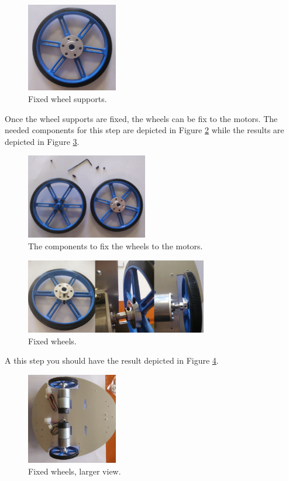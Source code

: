 \documentclass[10pt,a4paper]{report}   %
\begin{document}
\begin{figure}[H]
\center
\includegraphics[width=150px]{images/12.jpg}
\caption{Fixed wheel supports.}
\label{fig:12}
\end{figure}

Once the wheel supports are fixed, the wheels can be fix to the motors. The needed components for this step are depicted in Figure \ref{fig:13} while the results are depicted in Figure \ref{fig:14}.

\begin{figure}[H]
\center
\includegraphics[width=200px]{images/13.jpg}
\caption{The components to fix the wheels to the motors.}
\label{fig:13}
\end{figure}


\begin{figure}[H]
\center
\includegraphics[width=300px]{images/14.jpg}
\caption{Fixed wheels.}
\label{fig:14}
\end{figure}

A this step you should have the result depicted in Figure \ref{fig:15}.

\begin{figure}[H]
\center
\includegraphics[width=150px]{images/15.jpg}
\caption{Fixed wheels, larger view.}
\label{fig:15}
\end{figure}
\end{document}
